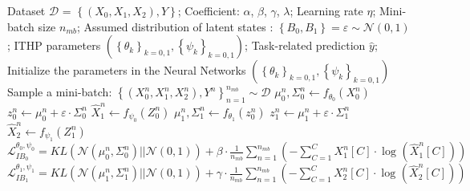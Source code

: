\begin{algorithm}[htb]
    \caption{Pseudo-code for training ITHP in 3-modalities scenario }
    \label{alg:alg3modalities}
    \begin{algorithmic}
      \Require Dataset $\mathcal{D}$ = $\left \{ \left ( X_{0}, X_{1},X_{2} \right ) ,Y \right \} $; Coefficient: $\alpha $, $\beta$, $\gamma$, $\lambda$; Learning rate $\eta$; Mini-batch size $n_{mb}$; Assumed distribution of latent states : $\left \{ B_{0},  B_{1} \right \}= \varepsilon \sim \mathcal{N} \left ( 0,1 \right )$;
      \Ensure ITHP parameters $(\left \{ \theta _{k}  \right \} _{k=0,1} ,\left \{ \psi _{k}  \right \} _{k=0,1} )$; Task-related prediction $\hat{y}$;
      \\Initialize the parameters in the Neural Networks $(\left \{ \theta _{k}  \right \} _{k=0,1},\left \{ \psi _{k}  \right \} _{k=0,1})$
    \Repeat
        \State Sample a mini-batch: $\left \{ \left ( X_{0}^{n} , X_{1}^{n},X_{2}^{n} \right ) ,Y^{n} \right \} _{n=1}^{n_{mb} }\sim \mathcal{D } $
      \State $\mu_{0}^{n} ,\Sigma_{0}^{n}\longleftarrow f_{\theta _{0} } \left ( X_{0}^{n} \right ) $
      \State $z_{0}^{n} \longleftarrow \mu _{0}^{n}+  \varepsilon \cdot \Sigma  _{0}^{n}$
      \State $\hat{X}_{1}^{n} \longleftarrow f_{\psi _{0}}\left (Z_{0}^{n}\right ) $
      \State $\mu_{1}^{n} ,\Sigma_{1}^{n}\longleftarrow f_{\theta _{1} } \left ( z_{0}^{n} \right ) $
      \State $z_{1}^{n} \longleftarrow \mu _{1}^{n}+  \varepsilon \cdot \Sigma  _{1}^{n}$
      \State $\hat{X}_{2}^{n} \longleftarrow f_{\psi _{1}}\left (Z_{1}^{n}\right ) $
    \EndFor 
        \State $\mathcal{L} _{IB_{0} }^{\theta _{0},\psi _{0} } =KL\left ( \mathcal{N}\left ( \mu _{0}^{n} ,\Sigma _{0}^{n}  \right )|| \mathcal{N}\left ( 0,1  \right )  \right )+\beta \cdot \frac{1}{n_{mb} }\sum_{n=1}^{n_{mb}}\left ( -\sum_{C=1}^{C}X_{1}^{n} \left [ C \right ] \cdot \log_{}{\left ( \hat{X} _{1}^{n} \left [ C\right ] \right ) }\right )  $
        \State $\mathcal{L} _{IB_{1} }^{\theta _{1},\psi _{1} } =KL\left ( \mathcal{N}\left ( \mu _{1}^{n} ,\Sigma _{1}^{n}  \right )|| \mathcal{N}\left ( 0,1  \right )  \right )+\gamma \cdot \frac{1}{n_{mb}}\sum_{n=1}^{n_{mb}}\left ( -\sum_{C=1}^{C}X_{2}^{n} \left [ C \right ] \cdot \log_{}{\left ( \hat{X} _{2}^{n} \left [ C\right ] \right ) }\right ) $


\end{algorithmic}
\end{algorithm}
